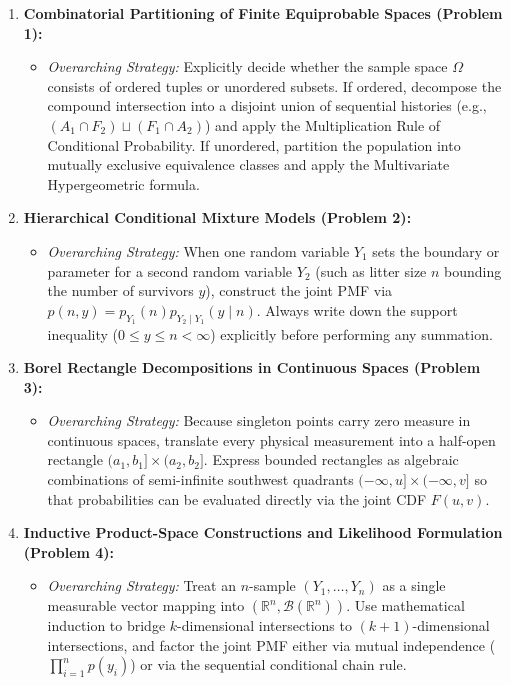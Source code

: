\documentclass[11pt, letterpaper]{article}
\theoremstyle{definition}
\theoremstyle{remark}
\newcommand{\R}{\mathbb{R}}
\begin{document}
\begin{enumerate}[label=\textbf{\arabic*.}]
    \item \textbf{Combinatorial Partitioning of Finite Equiprobable Spaces (Problem 1):}
    \begin{itemize}
        \item \emph{Overarching Strategy:} Explicitly decide whether the sample space $\Omega$ consists of ordered tuples or unordered subsets. If ordered, decompose the compound intersection into a disjoint union of sequential histories (e.g., $(A_1 \cap F_2) \sqcup (F_1 \cap A_2)$) and apply the Multiplication Rule of Conditional Probability. If unordered, partition the population into mutually exclusive equivalence classes and apply the Multivariate Hypergeometric formula.
    \end{itemize}

    \item \textbf{Hierarchical Conditional Mixture Models (Problem 2):}
    \begin{itemize}
        \item \emph{Overarching Strategy:} When one random variable $Y_1$ sets the boundary or parameter for a second random variable $Y_2$ (such as litter size $n$ bounding the number of survivors $y$), construct the joint PMF via $p(n, y) = p_{Y_1}(n) p_{Y_2 \mid Y_1}(y \mid n)$. Always write down the support inequality ($0 \le y \le n < \infty$) explicitly before performing any summation.
    \end{itemize}

    \item \textbf{Borel Rectangle Decompositions in Continuous Spaces (Problem 3):}
    \begin{itemize}
        \item \emph{Overarching Strategy:} Because singleton points carry zero measure in continuous spaces, translate every physical measurement into a half-open rectangle $(a_1, b_1] \times (a_2, b_2]$. Express bounded rectangles as algebraic combinations of semi-infinite southwest quadrants $(-\infty, u] \times (-\infty, v]$ so that probabilities can be evaluated directly via the joint CDF $F(u, v)$.
    \end{itemize}

    \item \textbf{Inductive Product-Space Constructions and Likelihood Formulation (Problem 4):}
    \begin{itemize}
        \item \emph{Overarching Strategy:} Treat an $n$-sample $(Y_1, \dots, Y_n)$ as a single measurable vector mapping into $(\R^n, \mathcal{B}(\R^n))$. Use mathematical induction to bridge $k$-dimensional intersections to $(k+1)$-dimensional intersections, and factor the joint PMF either via mutual independence ($\prod_{i=1}^n p(y_i)$) or via the sequential conditional chain rule.
    \end{itemize}


\end{enumerate}
\end{document}

